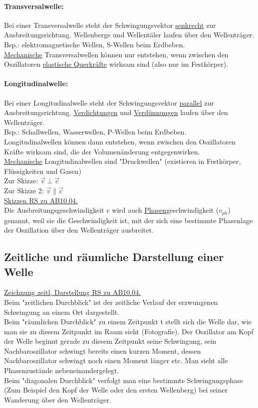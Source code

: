 \paragraph{Transversalwelle:} 
Bei einer Transversalwelle steht der Schwingungsvektor \underline{senkrecht} zur Ausbreitungsrichtung. Wellenberge und Wellentäler laufen über den Wellenträger. \\
Bsp.: elektromagnetische Wellen, S-Wellen beim Erdbeben. \\
\underline{Mechanische} Transversalwellen können nur entstehen, wenn zwischen den Oszillatoren \underline{elastische Querkräfte} wirksam sind (also nur im Festkörper).

\paragraph{Longitudinalwelle:} 
Bei einer Longitudinalwelle steht der Schwingungsvektor \underline{parallel} zur Ausbreitungsrichtung. \underline{Verdichtungen} und \underline{Verdünnungen} laufen über den Wellenträger. \\
Bsp.: Schallwellen, Wasserwellen, P-Wellen beim Erdbeben. \\
Longitudinalwellen können dann entstehen, wenn zwischen den Oszillatoren Kräfte wirksam sind, die der Volumenänderung entgegenwirken.\\
\underline{Mechanische} Longitudinalwellen sind "Druckwellen" (existieren in Festkörper, Flüssigkeiten und Gasen) \\
Zur Skizze: $\overrightarrow{v} \perp \overrightarrow{c}$ \\
Zur Skizze 2: $\overrightarrow{v} \parallel \overrightarrow{c}$ \\
\underline{Skizzen RS zu AB10.04. } \\
Die Ausbreitungsgeschwindigkeit c wird auch \underline{Phasen}geschwindigkeit ($v_{ph}$) genannt, weil sie die Geschwindigkeit ist, mit der sich eine bestimmte Phasenlage der Oszillation über den Wellenträger ausbreitet.

\subsection{Zeitliche und räumliche Darstellung einer Welle}
\underline{Zeichnung zeitl, Darstellung RS zu AB10.04. }
\vspace{2mm} \\
Beim "zeitlichen Durchblick" ist der zeitliche Verlauf der erzwungenen Schwingung an einem Ort dargestellt. \\
Beim "räumlichen Durchblick" zu einem Zeitpunkt t stellt sich die Welle dar, wie man sie zu diesem Zeitpunkt im Raum sieht (Fotografie). Der Oszillator am Kopf der Welle beginnt gerade zu diesem Zeitpunkt seine Schwingung, sein Nachbaroszillator schwingt bereits einen kurzen Moment, dessen Nachbaroszillator schwingt noch einen Moment länger etc. Man sieht alle Phasenzustände nebeneinandergelegt. \\
Beim "diagonalen Durchblick" verfolgt man eine bestimmte Schwingungsphase (Zum Beispiel den Kopf der Welle oder den ersten Wellenberg) bei seiner Wanderung über den Wellenträger.

